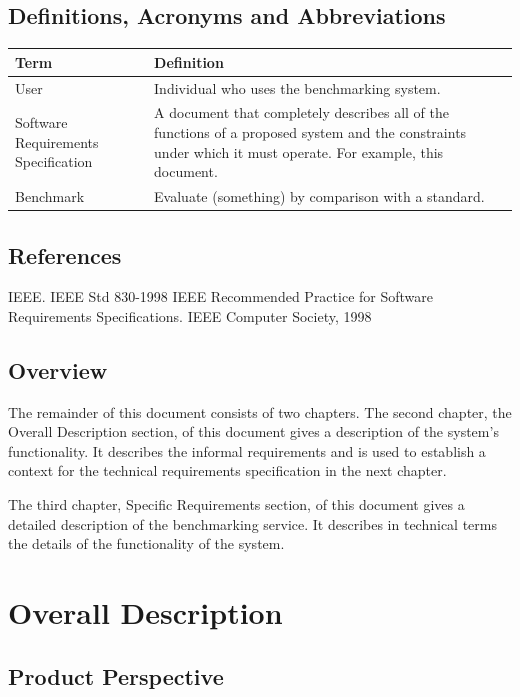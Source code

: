 \documentclass[a4paper,12pt]{article}
\begin{document}
\subsection{Definitions, Acronyms and Abbreviations}
\begin{center}
\begin{tabular}{ |l|l{\textwidth}| } 
\hline
Term & Definition \\ 
\hline
User & Individual who uses the benchmarking system. \\ 
\hline
Software Requirements Specification & A document that completely describes all of the functions of a proposed system and the constraints under which it must operate. For example, this document. \\ 
\hline
Benchmark & Evaluate (something) by comparison with a standard.
\hline
\end{tabular}
\end{center}

\subsection{References}
IEEE. IEEE Std 830-1998 IEEE Recommended Practice for Software Requirements Specifications. IEEE Computer Society, 1998

\subsection{Overview}
The remainder of this document consists of two chapters. The second chapter, the Overall Description section, of this document gives a description of the system's functionality. It describes the informal requirements and is used to establish a context for the technical requirements specification in the next chapter.

The third chapter, Specific Requirements section, of this document gives a detailed description of the benchmarking service. It describes in technical terms the details of the functionality of the system.

\section{Overall Description}



\subsection{Product Perspective}
\end{document}
